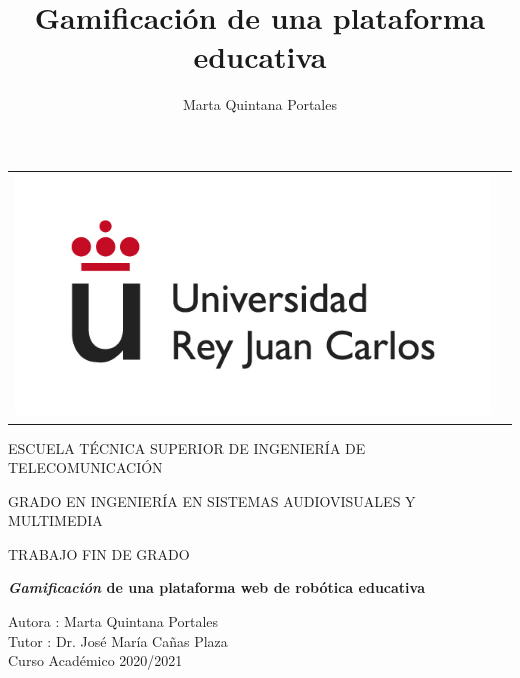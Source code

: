 \documentclass[a4paper, 12pt, oneside]{book}
\title{Gamificación de una plataforma educativa}
\author{Marta Quintana Portales}
\begin{document}
\begin{titlepage}
\begin{center}
\begin{tabular}[c]{c c}
\includegraphics[scale=0.4]{logo-rey-juan-carlos.jpg} &
\end{tabular}


\vspace{0.5cm}

\Large
ESCUELA TÉCNICA SUPERIOR DE INGENIERÍA DE
TELECOMUNICACIÓN 
\vspace{1cm}

\Large
GRADO EN INGENIERÍA EN SISTEMAS AUDIOVISUALES Y MULTIMEDIA

\vspace{0.8cm}

TRABAJO FIN DE GRADO

\vspace{1.5cm}

\LARGE
\textbf{
\textit{Gamificación} de una plataforma web de robótica educativa}
\vspace{1.5cm}

\large
Autora : Marta Quintana Portales\\
Tutor : Dr. José María Cañas Plaza \\

\vspace{1.5cm}
\large
Curso Académico 2020/2021
\end{center}
\end{titlepage}



\normalsize


\end{document}
